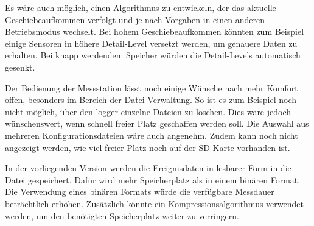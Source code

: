 Es wäre auch möglich, einen Algorithmus zu entwickeln, der das aktuelle Geschiebeaufkommen verfolgt und je nach Vorgaben in einen anderen Betriebsmodus wechselt. Bei hohem Geschiebeaufkommen könnten zum Beispiel einige Sensoren in höhere Detail-Level versetzt werden, um genauere Daten zu erhalten. Bei knapp werdendem Speicher würden die Detail-Levels automatisch gesenkt.

Der Bedienung der Messstation lässt noch einige Wünsche nach mehr Komfort offen, besonders im Bereich der Datei-Verwaltung. So ist es zum Beispiel noch nicht möglich, über den \gls{logger} einzelne Dateien zu löschen. Dies wäre jedoch wünschenswert, wenn schnell freier Platz geschaffen werden soll. Die Auswahl aus mehreren Konfigurationsdateien wäre auch angenehm. Zudem kann noch nicht angezeigt werden, wie viel freier Platz noch auf der SD-Karte vorhanden ist.

In der vorliegenden Version werden die Ereignisdaten in lesbarer Form in die Datei gespeichert. Dafür wird mehr Speicherplatz als in einem binären Format. Die Verwendung eines binären Formats würde die verfügbare Messdauer beträchtlich erhöhen. Zusätzlich könnte ein Kompressionsalgorithmus verwendet werden, um den benötigten Speicherplatz weiter zu verringern.
